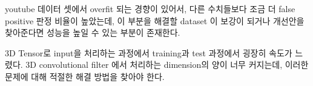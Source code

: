 \documentclass{article}
\begin{document}
	youtube 데이터 셋에서 overfit 되는 경향이 있어서, 다른 수치들보다 조금 더 false positive 판정 비율이 높았는데, 이 부분을 해결할 dataset 이 보강이 되거나 개선안을 찾아준다면 성능을 높일 수 있는 부분이 존재한다. 
	
	3D Tensor로 input을 처리하는 과정에서 training과 test 과정에서 굉장히 속도가 느렸다. 3D convolutional filter 에서 처리하는 dimension의 양이 너무 커지는데, 이러한 문제에 대해 적절한 해결 방법을 찾아야 한다.
	
	
	
	
	
	
	
\end{document}
